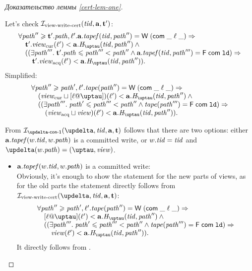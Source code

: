 \begin{proof}[Доказательство леммы \ref{cert-lem-one}]
\begin{itemize}
      Let's check $\mathcal{I}_{\textup{\rm view-write-cert}}(\mathit{tid}, \mathbf{a}, \mathbf{t}')$:
      \[\begin{array}{l}
        \forall \cpath'' \ge \tT'.\cpath, \loc'. \aT.\tapef(\tId, \cpath'') = \tapeWrite{(\tapeWriteCommitted{\_}{\loc}{\_})} \Rightarrow \\
        \quad \tT'.\Rcur(\loc') < \aT.\tmap(\tId, \cpath'') \land {} \\
        \quad ((\exists \cpath'''. \; \tT'.\cpath \le \cpath''' < \cpath'' \land 
             \aT.\tapef(\tId, \cpath''') = \tapeFence{\Committed}{\LD}) \Rightarrow \\
        \qquad \tT'.\Racq(\loc') < \aT.\tmap(\tId, \cpath'')).\\
      \end{array}\]
      Simplified:
      \[\begin{array}{l}
        \forall \cpath'' \ge \cpath', \loc'. \tape(\cpath'') = \tapeWrite{(\tapeWriteCommitted{\_}{\loc}{\_})} \Rightarrow \\
        \quad (\Rcur \sqcup [\loc @ \tau])(\loc') < \aT.\tmap(\tId, \cpath'') \land {} \\
        \quad ((\exists \cpath'''. \; \cpath' \le \cpath''' < \cpath'' \land 
             \tape(\cpath''') = \tapeFence{\Committed}{\LD}) \Rightarrow \\
        \qquad (\Racq \sqcup \R)(\loc') < \aT.\tmap(\tId, \cpath'')).\\
      \end{array}\]
      
      From $\invDeltaDefOne(\delta, \tId, \aT, \tT)$ follows that there are two options:
      either $\mathbf{a}.\mathit{tapef}(w.\mathit{tid}, w.\mathit{path})$ is a committed write, or $w.\mathit{tid} = \mathit{tid}$ and $\delta(\w.\cpath) = (\tau, \R)$.
      
      \begin{itemize}
        \item $\mathbf{a}.\mathit{tapef}(w.\mathit{tid}, w.\mathit{path})$ is a committed write: \\
      Obviously, it's enough to show the statement for the new parts of views, as for the old parts the statement directly
      follows from $\invViewWriteCERT(\delta, \tId, \aT, \tT)$:
      \[\begin{array}{l}
        \forall \cpath'' \ge \cpath', \loc'. \tape(\cpath'') = \tapeWrite{(\tapeWriteCommitted{\_}{\loc}{\_})} \Rightarrow \\
        \quad [\loc @ \tau](\loc') < \aT.\tmap(\tId, \cpath'') \land {} \\
        \quad ((\exists \cpath'''. \; \cpath' \le \cpath''' < \cpath'' \land 
             \tape(\cpath''') = \tapeFence{\Committed}{\LD}) \Rightarrow \\
        \qquad \R(\loc') < \aT.\tmap(\tId, \cpath'')).\\
      \end{array}\]
      It directly follows from \app{\ref{thm:invAview}}.


\end{itemize}
\end{itemize}
\end{proof}
